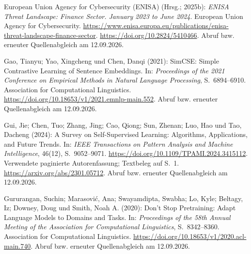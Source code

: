\par\smallskip
\begin{samepage}
\noindent
European Union Agency for Cybersecurity (ENISA) (Hrsg.; 2025b):
\textit{ENISA Threat Landscape: Finance Sector. January 2023 to June 2024}.
European Union Agency for Cybersecurity.
\url{https://www.enisa.europa.eu/publications/enisa-threat-landscape-finance-sector}.
\url{https://doi.org/10.2824/5410466}.
Abruf bzw. erneuter Quellenabgleich am 12.09.2026.
\par\end{samepage}
\par\smallskip
\begin{samepage}
\noindent
Gao, Tianyu; Yao, Xingcheng und Chen, Danqi (2021):
SimCSE: Simple Contrastive Learning of Sentence Embeddings.
In: \textit{Proceedings of the 2021 Conference on Empirical Methods in Natural Language Processing},
S.~6894--6910.
Association for Computational Linguistics.
\url{https://doi.org/10.18653/v1/2021.emnlp-main.552}.
Abruf bzw. erneuter Quellenabgleich am 12.09.2026.
\par\end{samepage}
\par\smallskip
\begin{samepage}
\noindent
Gui, Jie; Chen, Tuo; Zhang, Jing; Cao, Qiong; Sun, Zhenan; Luo, Hao und Tao, Dacheng (2024):
A Survey on Self-Supervised Learning: Algorithms, Applications, and Future Trends.
In: \textit{IEEE Transactions on Pattern Analysis and Machine Intelligence}, 46(12),
S.~9052--9071.
\url{https://doi.org/10.1109/TPAMI.2024.3415112}.
Verwendete paginierte Autorenfassung; Textbeleg auf S.~1. \url{https://arxiv.org/abs/2301.05712}.
Abruf bzw. erneuter Quellenabgleich am 12.09.2026.
\par\end{samepage}
\par\smallskip
\begin{samepage}
\noindent
Gururangan, Suchin; Marasović, Ana; Swayamdipta, Swabha; Lo, Kyle;
Beltagy, Iz; Downey, Doug und Smith, Noah A. (2020):
Don't Stop Pretraining: Adapt Language Models to Domains and Tasks.
In: \textit{Proceedings of the 58th Annual Meeting of the Association for Computational Linguistics},
S.~8342--8360.
Association for Computational Linguistics.
\url{https://doi.org/10.18653/v1/2020.acl-main.740}.
Abruf bzw. erneuter Quellenabgleich am 12.09.2026.
\par\end{samepage}
\par\smallskip
